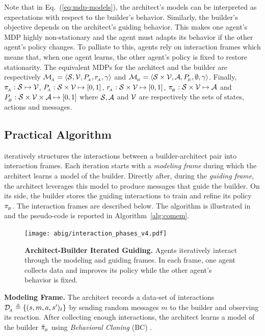 Note that in Eq.~(\ref{eq:mdp-models}), the architect's models can be interpreted as expectations with respect to the builder's behavior. Similarly, the builder's objective depends on the architect's guiding behavior. This makes one agent's MDP highly non-stationary and the agent must adapts its behavior if the other agent's policy changes. To palliate to this, agents rely on interaction frames which means that, when one agent learns, the other agent's policy is fixed to restore stationarity. The equivalent MDPs for the architect and the builder are respectively ${\mathcal{M}}_{\!_A} = \langle {\mathcal{S}}, {\mathcal{V}}, P_{\!_A}, r_{\!_A}, \gamma \rangle$ and ${\mathcal{M}}_{\!_B} = \langle {\mathcal{S}} \times {\mathcal{V}}, {\mathcal{A}}, P_{\!_B}, \emptyset, \gamma \rangle$. Finally, $\pi_{\!_A}:{\mathcal{S}} \mapsto {\mathcal{V}}$, $P_{\!_A}:{\mathcal{S}}\times{\mathcal{V}}\mapsto[0,1]$, $r_{\!_A}:{\mathcal{S}}\times{\mathcal{V}}\mapsto[0,1]$, $\pi_{\!_B}:{\mathcal{S}}\times{\mathcal{V}}\mapsto{\mathcal{A}}$ and $P_{\!_B}:{\mathcal{S}}\times{\mathcal{V}}\times{\mathcal{A}}\mapsto[0,1]$ where ${\mathcal{S}}, {\mathcal{A}}$ and ${\mathcal{V}}$ are respectively the sets of states, actions and messages. 

\subsection{Practical Algorithm}
\abig iteratively structures the interactions between a builder-architect pair into interaction frames. Each iteration starts with a \textit{modeling frame} during which the architect learns a model of the builder. Directly after, during the \textit{guiding frame}, the architect leverages this model to produce messages that guide the builder. On its side, the builder stores the guiding interactions to train and refine its policy $\pi_{\!_B}$. The interaction frames are described below. The algorithm is illustrated in  and the pseudo-code is reported in Algorithm~\ref{alg:comem}.

\label{subsec:practical_algo}
\begin{figure}[!h]
    \centering
    \texttt{[image: abig/interaction\_phases\_v4.pdf]}
    \caption{\textbf{Architect-Builder Iterated Guiding.} Agents iteratively interact through the modeling and guiding frames. In each frame, one agent collects data and improves its policy while the other agent's behavior is fixed.}
    \label{fig:agent-interact}
\end{figure}






\noindent\textbf{Modeling Frame. } The architect records a data-set of interactions $\mathcal{D}_{\!_A} \triangleq \{(s,m,a,s')_t\}$ by sending random messages $m$ to the builder and observing its reaction. After collecting enough interactions, the architect learns a model of the builder $\tilde{\pi}_{\!_B}$ using \textit{Behavioral Cloning} (BC) \citep{pomerleau1991efficient}.

